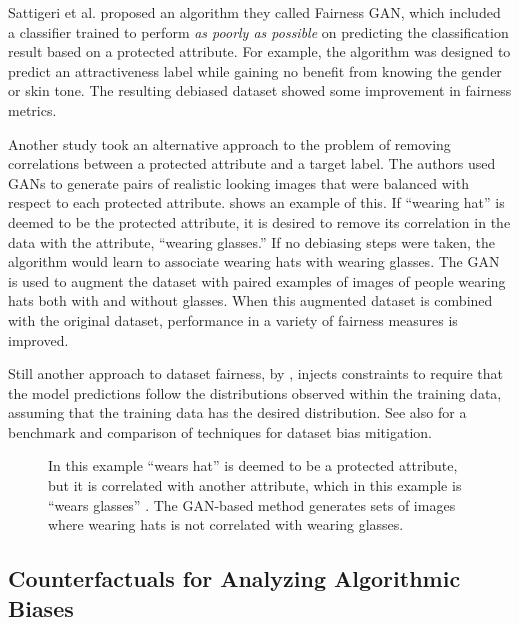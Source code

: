 Sattigeri et al. \cite{Sattigeri2019} proposed an algorithm they called Fairness GAN, which included a classifier trained to perform {\em as poorly as possible} on predicting the classification result based on a protected attribute.  For example, the algorithm was designed to predict an attractiveness label while gaining no benefit from knowing the gender or skin tone.  The resulting debiased dataset showed some improvement in fairness metrics.

Another study \cite{Ramaswamy2021}  took an alternative approach to the problem of removing correlations between a protected attribute and a target label.  The authors  used GANs to generate pairs of realistic looking images that were balanced with respect to each protected attribute.  \Fig{\ref{fig:augmentation}} shows an example of this.  If ``wearing hat'' is deemed to be the protected attribute, it is desired to remove its correlation in the data with the attribute, ``wearing glasses.'' If no debiasing steps were taken, the algorithm would learn to associate wearing hats with wearing glasses.  The GAN is used to augment the dataset with paired examples of images of people wearing hats both with and without glasses.
When this augmented dataset is combined with the original dataset, performance in a variety of fairness measures is improved.

Still another approach to dataset fairness, by \cite{Zhao2017},
injects constraints to require that the model predictions follow the
distributions observed within the
training data, assuming that the training data has the desired distribution.
See also \cite{Wang2020} for a  benchmark and comparison of techniques for dataset bias mitigation.

\begin{figure}[t]
\centerline{
}
\caption{In this example ``wears hat'' is deemed to be a protected attribute, but it is correlated with another attribute, which in this example is ``wears glasses'' \cite{Ramaswamy2021}. The GAN-based method generates sets of images where wearing hats is not correlated with wearing glasses.}
\label{fig:augmentation}
\end{figure}


\subsection{Counterfactuals for Analyzing Algorithmic Biases}

